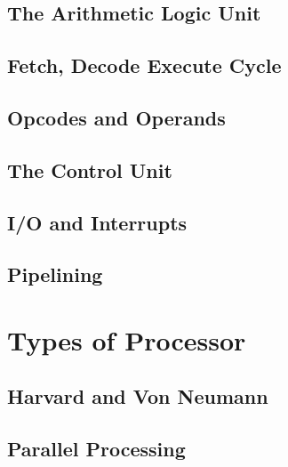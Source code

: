 		\subsection{The Arithmetic Logic Unit}
		
		\subsection{Fetch, Decode Execute Cycle}
		
		\subsection{Opcodes and Operands}
		
		\subsection{The Control Unit}
		
		\subsection{I/O and Interrupts}
		
		\subsection{Pipelining}
		
	\section{Types of Processor}
		
		\subsection{Harvard and Von Neumann}
		
		\subsection{Parallel Processing}
		

		